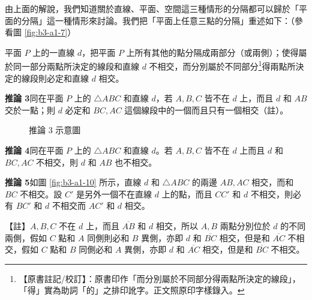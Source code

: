由上面的解說，我們知道關於直線、平面、空間這三種情形的分隔都可以歸於「平面的分隔」這一種情形來討論。我們把「平面上任意三點的分隔」重述如下：（參看圖 \ref{fig:b3-a1-7}）

平面 $P$ 上的一直線 $d$，把平面 $P$ 上所有其他的點分隔成兩部分（或兩側）；使得屬於同一部分兩點所決定的線段和直線 $d$ 不相交，而分別屬於不同部分\label{note:b3-a1-p266-de}\footnote{【原書註記/校訂】：原書印作「而分別屬於不同部分得兩點所決定的線段」，「得」實為助詞「的」之排印訛字。正文照原印字樣錄入。}得兩點所決定的線段則必定和直線 $d$ 相交。

\noindent\textbf{推論 3}\quad 同在平面 $P$ 上的 $\triangle ABC$ 和直線 $d$，若 $A, B, C$ 皆不在 $d$ 上，而且 $d$ 和 $AB$ 交於一點；則 $d$ 必定和 $BC, AC$ 這個線段中的一個而且只有一個相交（註）。

\begin{figure}[H]
\centering
{}
\caption{推論 3 示意圖}
\label{fig:b3-a1-9}
\end{figure}

\noindent\textbf{推論 4}\quad 同在平面 $P$ 上的 $\triangle ABC$ 和直線 $d$。若 $A, B, C$ 皆不在 $d$ 上而且 $d$ 和 $BC, AC$ 不相交，則 $d$ 和 $AB$ 也不相交。

\noindent\textbf{推論 5}\quad 如圖 \ref{fig:b3-a1-10} 所示，直線 $d$ 和 $\triangle ABC$ 的兩邊 $AB, AC$ 相交，而和 $BC$ 不相交。設 $C'$ 是另外一個不在直線 $d$ 上的點，而且 $CC'$ 和 $d$ 不相交，則必有 $BC'$ 和 $d$ 不相交而 $AC'$ 和 $d$ 相交。

\noindent【註】\quad $A, B, C$ 不在 $d$ 上，而且 $\overline{AB}$ 和 $d$ 相交，所以 $A, B$ 兩點分別位於 $d$ 的不同兩側，假如 $C$ 點和 $A$ 同側則必和 $B$ 異側，亦即 $d$ 和 $\overline{BC}$ 相交，但是和 $\overline{AC}$ 不相交，假如 $C$ 點和 $B$ 同側必和 $A$ 異側，亦即 $d$ 和 $\overline{AC}$ 相交，但是和 $\overline{BC}$ 不相交。

